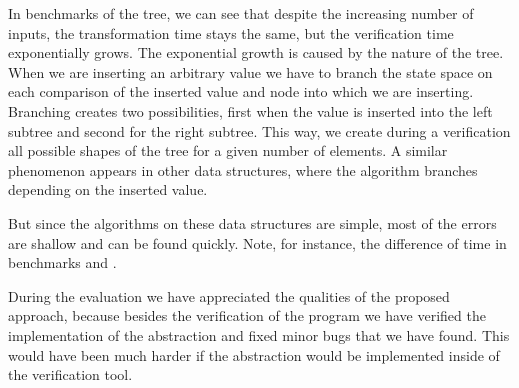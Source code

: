 In benchmarks of the \AVL tree, we can see that despite the increasing number of
inputs, the transformation time stays the same, but the verification time
exponentially grows. The exponential growth is caused by the nature of the \AVL
tree. When we are inserting an arbitrary value we have to branch the state space
on each comparison of the inserted value and node into which we are inserting.
Branching creates two possibilities, first when the value is inserted into the
left subtree and second for the right subtree. This way, we create during a
verification all possible shapes of the \AVL tree for a given number of elements.
A similar phenomenon appears in other data structures, where the algorithm
branches depending on the inserted value.

But since the algorithms on these data structures are simple, most of the errors
are shallow and can be found quickly. Note, for instance, the difference of time
in benchmarks  and .

During the evaluation we have appreciated the qualities of the proposed
approach, because besides the verification of the program we have verified the
implementation of the abstraction and fixed minor bugs that we have found. This
would have been much harder if the abstraction would be implemented inside of the
verification tool.
